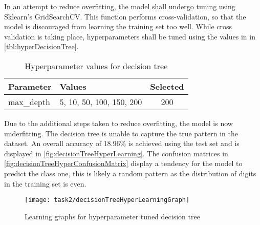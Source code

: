 In an attempt to reduce overfitting, the model shall undergo tuning using Sklearn's GridSearchCV. This function performs cross-validation, so that the model is discouraged from learning the training set too well. While cross validation is taking place, hyperparameters shall be tuned using the values in in \autoref{tbl:hyperDecisionTree}. 

\bgroup
    \begin{table}[!htbp]
        \centering
        \begin{tabular}{ll|c}
            \hline
            Parameter & Values & Selected \\ \hline
            max\_depth & 5, 10, 50, 100, 150, 200 & 200 \\
        \end{tabular}
        \caption{Hyperparameter values for decision tree}
        \label{tbl:hyperDecisionTree}
    \end{table}

Due to the additional steps taken to reduce overfitting, the model is now underfitting. The decision tree is unable to capture the true pattern in the dataset. An overall accuracy of 18.96\% is achieved using the test set and is displayed in \autoref{fig:decisionTreeHyperLearning}. The confusion matrices in \autoref{fig:decisionTreeHyperConfusionMatrix} display a tendency for the model to predict the class one, this is likely a random pattern as the distribution of digits in the training set is even.

\begin{figure}[!htbp]
    \centering
    \texttt{[image: task2/decisionTreeHyperLearningGraph]}
    \caption[Learning graphs for hyperparameter tuned decision tree]
    {Learning graphs for hyperparameter tuned decision tree}
    \label{fig:decisionTreeHyperLearning}
\end{figure}


